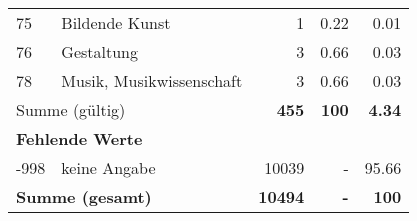 \begin{longtable}{lXrrr}
        75 & \multicolumn{1}{X}{Bildende Kunst} & %
          \num{1} &
          \num[round-mode=places,round-precision=2]{0.22} &
          \num[round-mode=places,round-precision=2]{0.01} \\

        76 & \multicolumn{1}{X}{Gestaltung} & %
          \num{3} &
          \num[round-mode=places,round-precision=2]{0.66} &
          \num[round-mode=places,round-precision=2]{0.03} \\

        78 & \multicolumn{1}{X}{Musik, Musikwissenschaft} & %
          \num{3} &
          \num[round-mode=places,round-precision=2]{0.66} &
          \num[round-mode=places,round-precision=2]{0.03} \\

     \midrule
     \multicolumn{2}{l}{Summe (gültig)} &
       \textbf{\num{455}} &
     \textbf{\num{100}} &
       \textbf{\num[round-mode=places,round-precision=2]{4.34}} \\
     \multicolumn{5}{l}{\textbf{Fehlende Werte}}\\
       -998 &
       keine Angabe &
         \num{10039} &
        - &
         \num[round-mode=places,round-precision=2]{95.66} \\
     \midrule
     \multicolumn{2}{l}{\textbf{Summe (gesamt)}} &
          \textbf{\num{10494}} &
        \textbf{-} &
        \textbf{\num{100}} \\
     \bottomrule
     \end{longtable}
     
